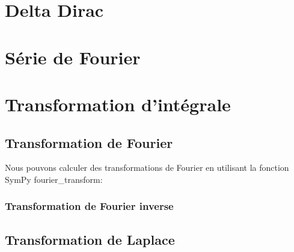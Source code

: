 \chapter{Delta Dirac}
\chapter{Série de Fourier}

\chapter{Transformation d'intégrale}
 \section{Transformation de Fourier}
 Nous pouvons calculer des transformations de Fourier en utilisant la fonction SymPy fourier\_transform:

 \begin{exercise}
 \end{exercise}
 \begin{exercise}
 \end{exercise}
 \begin{exercise}
 \end{exercise}
  \subsection{Transformation de Fourier inverse}
  \begin{exercise}
 \end{exercise}
 \begin{exercise}
 \end{exercise}
 \section{Transformation de Laplace}
 \begin{python}
 \end{python}
 \begin{exercise}
 \end{exercise}
